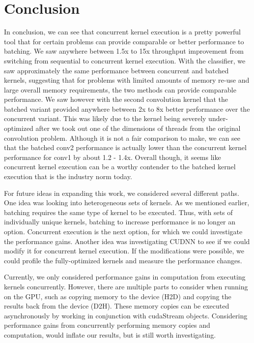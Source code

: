 \documentclass[sigconf]{acmart}
\begin{document}
\section{Conclusion}
In conclusion, we can see that concurrent kernel execution is a pretty powerful tool that for certain problems can provide comparable or better performance to batching. We saw anywhere between 1.5x to 15x throughput improvement from switching from sequential to concurrent kernel execution. With the classifier, we saw approximately the same performance between concurrent and batched kernels, suggesting that for problems with limited amounts of memory re-use and large overall memory requirements, the two methods can provide comparable performance. We saw however with the second convolution kernel that the batched variant provided anywhere between 2x to 8x better performance over the concurrent variant. This was likely due to the kernel being severely under-optimized after we took out one of the dimensions of threads from the original convolution problem. Although it is not a fair comparison to make, we can see that the batched conv2 performance is actually lower than the concurrent kernel performance for conv1 by about 1.2 - 1.4x. Overall though, it seems like concurrent kernel execution can be a worthy contender to the batched kernel execution that is the industry norm today. 

For future ideas in expanding this work, we considered several different paths. One idea was looking into heterogeneous sets of kernels. As we mentioned earlier, batching requires the same type of kernel to be executed. Thus, with sets of individually unique kernels, batching to increase performance is no longer an option. Concurrent execution is the next option, for which we could investigate the performance gains. Another idea was investigating CUDNN to see if we could modify it for concurrent kernel execution. If the modifications were possible, we could profile the fully-optimized kernels and measure the performance changes.
  
Currently, we only considered performance gains in computation from executing kernels concurrently. However, there are multiple parts to consider when running on the GPU, such as copying memory to the device (H2D) and copying the results back from the device (D2H). These memory copies can be executed asynchronously by working in conjunction with cudaStream objects. Considering performance gains from concurrently performing memory copies and computation, would inflate our results, but is still worth investigating.
\end{document}
